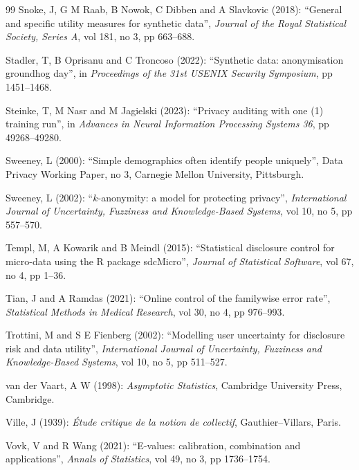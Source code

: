 \documentclass[11pt,a4paper]{article}
\theoremstyle{plain}
\theoremstyle{definition}
\theoremstyle{definition}
\theoremstyle{plain}
\begin{document}
\begin{thebibliography}{99}
Snoke, J, G M Raab, B Nowok, C Dibben and A Slavkovic (2018): ``General and specific utility measures for synthetic data'', \emph{Journal of the Royal Statistical Society, Series A}, vol 181, no 3, pp 663--688.

Stadler, T, B Oprisanu and C Troncoso (2022): ``Synthetic data: anonymisation groundhog day'', in \emph{Proceedings of the 31st USENIX Security Symposium}, pp 1451--1468.

Steinke, T, M Nasr and M Jagielski (2023): ``Privacy auditing with one (1) training run'', in \emph{Advances in Neural Information Processing Systems 36}, pp 49268--49280.

Sweeney, L (2000): ``Simple demographics often identify people uniquely'', Data Privacy Working Paper, no 3, Carnegie Mellon University, Pittsburgh.

Sweeney, L (2002): ``$k$-anonymity: a model for protecting privacy'', \emph{International Journal of Uncertainty, Fuzziness and Knowledge-Based Systems}, vol 10, no 5, pp 557--570.

Templ, M, A Kowarik and B Meindl (2015): ``Statistical disclosure control for micro-data using the R package sdcMicro'', \emph{Journal of Statistical Software}, vol 67, no 4, pp 1--36.

Tian, J and A Ramdas (2021): ``Online control of the familywise error rate'', \emph{Statistical Methods in Medical Research}, vol 30, no 4, pp 976--993.

Trottini, M and S E Fienberg (2002): ``Modelling user uncertainty for disclosure risk and data utility'', \emph{International Journal of Uncertainty, Fuzziness and Knowledge-Based Systems}, vol 10, no 5, pp 511--527.

van der Vaart, A W (1998): \emph{Asymptotic Statistics}, Cambridge University Press, Cambridge.

Ville, J (1939): \emph{\'Etude critique de la notion de collectif}, Gauthier--Villars, Paris.

Vovk, V and R Wang (2021): ``E-values: calibration, combination and applications'', \emph{Annals of Statistics}, vol 49, no 3, pp 1736--1754.


\end{thebibliography}
\end{document}
